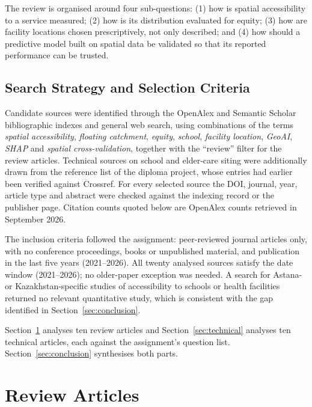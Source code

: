 \documentclass[journal]{IEEEtran}
\begin{document}
The review is organised around four sub-questions: (1) how is spatial accessibility to a service measured; (2) how is its distribution evaluated for equity; (3) how are facility locations chosen prescriptively, not only described; and (4) how should a predictive model built on spatial data be validated so that its reported performance can be trusted.

\subsection{Search Strategy and Selection Criteria}
Candidate sources were identified through the OpenAlex and Semantic Scholar bibliographic indexes and general web search, using combinations of the terms \emph{spatial accessibility}, \emph{floating catchment}, \emph{equity}, \emph{school}, \emph{facility location}, \emph{GeoAI}, \emph{SHAP} and \emph{spatial cross-validation}, together with the ``review'' filter for the review articles. Technical sources on school and elder-care siting were additionally drawn from the reference list of the diploma project, whose entries had earlier been verified against Crossref. For every selected source the DOI, journal, year, article type and abstract were checked against the indexing record or the publisher page. Citation counts quoted below are OpenAlex counts retrieved in September 2026.

The inclusion criteria followed the assignment: peer-reviewed journal articles only, with no conference proceedings, books or unpublished material, and publication in the last five years (2021--2026). All twenty analysed sources satisfy the date window (2021--2026); no older-paper exception was needed. A search for Astana- or Kazakhstan-specific studies of accessibility to schools or health facilities returned no relevant quantitative study, which is consistent with the gap identified in Section~\ref{sec:conclusion}.

Section~\ref{sec:reviews} analyses ten review articles and Section~\ref{sec:technical} analyses ten technical articles, each against the assignment's question list. Section~\ref{sec:conclusion} synthesises both parts.

\section{Review Articles}
\label{sec:reviews}
\end{document}
